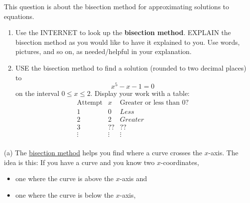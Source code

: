 \documentclass{ximera}
\begin{document}
\begin{question} This question is about the bisection method for approximating solutions to equations.
  \begin{enumerate}
    \item Use the INTERNET to look up the \textbf{bisection
      method}. EXPLAIN the bisection method as you would like to have
      it explained to you.  Use words, pictures, and so on, as
      needed/helpful in your explanation.
  \item USE the bisection method to find a solution (rounded to two
    decimal places) to
  \[
  x^5-x-1=0
  \]
  on the interval $0\le x\le 2$. Display your work with a table:
  \[
  \begin{array}{|c|c|c|c|}\hline
    \text{Attempt} & x & \text{Greater or less than $0$?} \\ \hline\hline
    1 & 0 & Less \\ \hline
    2 & 2 & Greater  \\ \hline
    3 & ?? & ??  \\ \hline
    \vdots & \vdots & \vdots \\ 
  \end{array}
  \]
  \end{enumerate}
  \begin{freeResponse}
    (a) The \underline{bisection method} helps you find where a curve
    crosses the $x$-axis. The idea is this: If you have a curve and
    you know two $x$-coordinates,
    \begin{itemize}
      \item one where the curve is above the
        $x$-axis and
      \item one where the curve is below the $x$-axis,
    \end{itemize}
    \begin{center}
\end{center}
\end{freeResponse}
\end{question}
\end{document}
